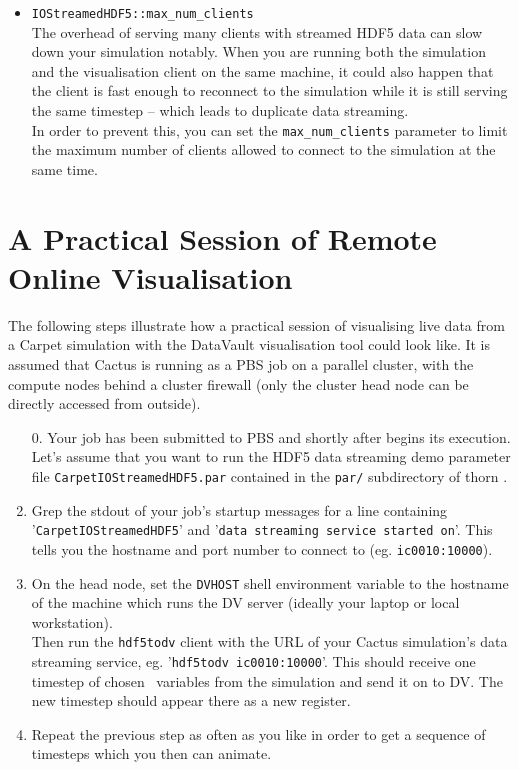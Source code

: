 \documentclass{article}
\begin{document}
\begin{itemize}
  \item {\tt IOStreamedHDF5::max\_num\_clients}\\
        The overhead of serving many clients with streamed HDF5 data can slow
        down your simulation notably. When you are running both the simulation
        and the visualisation client on the same machine, it could also happen
        that the client is fast enough to reconnect to the simulation while
        it is still serving the same timestep -- which leads to duplicate
        data streaming.\\
        In order to prevent this, you can set the {\tt max\_num\_clients}
        parameter to limit the maximum number of clients allowed to connect
        to the simulation at the same time.

\end{itemize}


\section{A Practical Session of Remote Online Visualisation}

The following steps illustrate how a practical session of visualising
live data from a Carpet simulation with the DataVault visualisation tool
could look like.
It is assumed that Cactus is running as a PBS job on a parallel cluster,
with the compute nodes behind a cluster firewall (only the cluster head node
can be directly accessed from outside).

\begin{enumerate}
  \item[0.] Your job has been submitted to PBS and shortly after begins its
        execution.\\
        Let's assume that you want to run the HDF5 data streaming
        demo parameter file {\tt CarpetIOStreamedHDF5.par} contained in the
        {\tt par/} subdirectory of thorn \ThisThorn.

  \item Grep the stdout of your job's startup messages for a line
        containing '{\tt CarpetIOStreamedHDF5}' and '{\tt data streaming
        service started on}'.
        This tells you the hostname and port number to connect to (eg. {\tt ic0010:10000}).

  \item On the head node, set the {\tt DVHOST} shell environment variable
        to the hostname of the machine which runs the DV server (ideally
        your laptop or local workstation).\\
        Then run the {\tt hdf5todv} client
        with the URL of your Cactus simulation's data streaming service, eg.
        '{\tt hdf5todv ic0010:10000}'. This should receive one timestep of
        chosen \ThisThorn\ variables from the simulation and
        send it on to DV. The new timestep should appear there as a new
        register.

  \item Repeat the previous step as often as you like in order
        to get a sequence of timesteps which you then can animate.

\end{enumerate}
\end{document}
